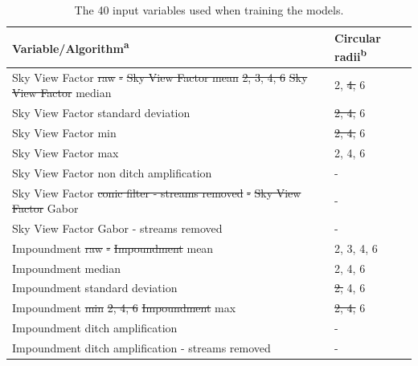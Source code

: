 \documentclass[]{interact}
\theoremstyle{plain}%
\theoremstyle{definition}
\theoremstyle{remark}
\providecommand{\DIFdeltex}[1]{{\protect\color{red}\sout{#1}}}                      %
\providecommand{\DIFdelFL}[1]{\DIFdel{#1}} %
\providecommand{\DIFaddbeginFL}{} %
\providecommand{\DIFaddendFL}{} %
\providecommand{\DIFdelbeginFL}{} %
\providecommand{\DIFdelendFL}{} %
\providecommand{\DIFdel}[1]{\texorpdfstring{\DIFdeltex{#1}}{}} %
\begin{document}
\begin{table} [!htb]
    \DIFdelbeginFL %
\DIFdelendFL \DIFaddbeginFL \caption{The 40 input variables used when training the models.}
    \DIFaddendFL {\begin{tabular}{ll} \toprule
      Variable/Algorithm\textsuperscript{a} & Circular radii\textsuperscript{b} \\ \midrule

      Sky View Factor \DIFdelbeginFL \DIFdelFL{raw }%
\DIFdelFL{-}%
\DIFdelFL{Sky View Factor mean }%
\DIFdelFL{2, 3, 4, 6 }%
\DIFdelFL{Sky View Factor }\DIFdelendFL median &2, \DIFdelbeginFL \DIFdelFL{4, }\DIFdelendFL 6 \\
      Sky View Factor standard deviation & \DIFdelbeginFL \DIFdelFL{2, 4, }\DIFdelendFL 6 \\
      Sky View Factor min & \DIFdelbeginFL \DIFdelFL{2, 4, }\DIFdelendFL 6 \\
      Sky View Factor max & 2, 4, 6 \\
      Sky View Factor non ditch amplification & - \\ 
      Sky View Factor \DIFdelbeginFL \DIFdelFL{conic filter - streams removed }%
\DIFdelFL{- }%
\DIFdelFL{Sky View Factor }\DIFdelendFL Gabor & - \\
      Sky View Factor Gabor - streams removed & -\\

      Impoundment \DIFdelbeginFL \DIFdelFL{raw }%
\DIFdelFL{- }%
\DIFdelFL{Impoundment }\DIFdelendFL mean & 2, 3, 4, 6 \\
      Impoundment median & 2, 4, 6 \\
      Impoundment standard deviation & \DIFdelbeginFL \DIFdelFL{2, }\DIFdelendFL 4, 6 \\
      Impoundment \DIFdelbeginFL \DIFdelFL{min }%
\DIFdelFL{2, 4, 6 }%
\DIFdelFL{Impoundment }\DIFdelendFL max & \DIFdelbeginFL \DIFdelFL{2, 4, }\DIFdelendFL 6 \\
      Impoundment ditch amplification & - \\
      Impoundment ditch amplification - streams removed & - \\


\end{tabular}}
\end{table}
\end{document}
